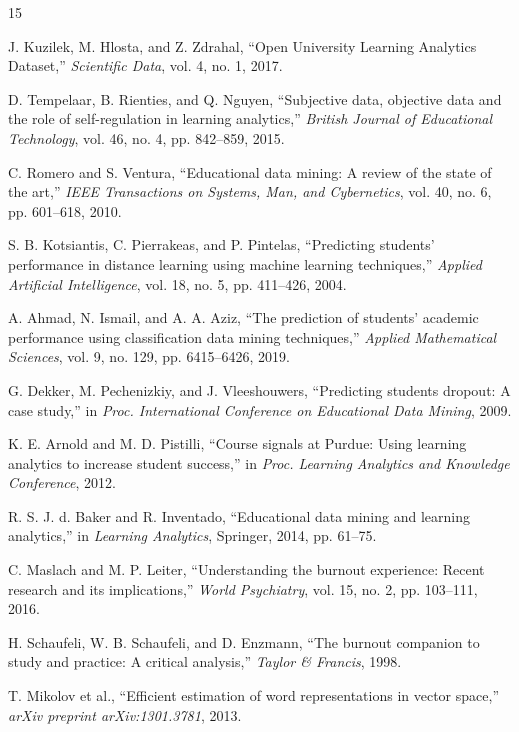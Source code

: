 \documentclass{VITSCOPEThesis}
\begin{document}
	\begin{thebibliography}{15}

J. Kuzilek, M. Hlosta, and Z. Zdrahal, “Open University Learning Analytics Dataset,” \textit{Scientific Data}, vol. 4, no. 1, 2017.

D. Tempelaar, B. Rienties, and Q. Nguyen, “Subjective data, objective data and the role of self-regulation in learning analytics,” \textit{British Journal of Educational Technology}, vol. 46, no. 4, pp. 842–859, 2015.

C. Romero and S. Ventura, “Educational data mining: A review of the state of the art,” \textit{IEEE Transactions on Systems, Man, and Cybernetics}, vol. 40, no. 6, pp. 601–618, 2010.

S. B. Kotsiantis, C. Pierrakeas, and P. Pintelas, “Predicting students’ performance in distance learning using machine learning techniques,” \textit{Applied Artificial Intelligence}, vol. 18, no. 5, pp. 411–426, 2004.

A. Ahmad, N. Ismail, and A. A. Aziz, “The prediction of students’ academic performance using classification data mining techniques,” \textit{Applied Mathematical Sciences}, vol. 9, no. 129, pp. 6415–6426, 2019.

G. Dekker, M. Pechenizkiy, and J. Vleeshouwers, “Predicting students dropout: A case study,” in \textit{Proc. International Conference on Educational Data Mining}, 2009.

K. E. Arnold and M. D. Pistilli, “Course signals at Purdue: Using learning analytics to increase student success,” in \textit{Proc. Learning Analytics and Knowledge Conference}, 2012.

R. S. J. d. Baker and R. Inventado, “Educational data mining and learning analytics,” in \textit{Learning Analytics}, Springer, 2014, pp. 61–75.

C. Maslach and M. P. Leiter, “Understanding the burnout experience: Recent research and its implications,” \textit{World Psychiatry}, vol. 15, no. 2, pp. 103–111, 2016.

H. Schaufeli, W. B. Schaufeli, and D. Enzmann, “The burnout companion to study and practice: A critical analysis,” \textit{Taylor \& Francis}, 1998.

T. Mikolov et al., “Efficient estimation of word representations in vector space,” \textit{arXiv preprint arXiv:1301.3781}, 2013.


\end{thebibliography}
\end{document}
